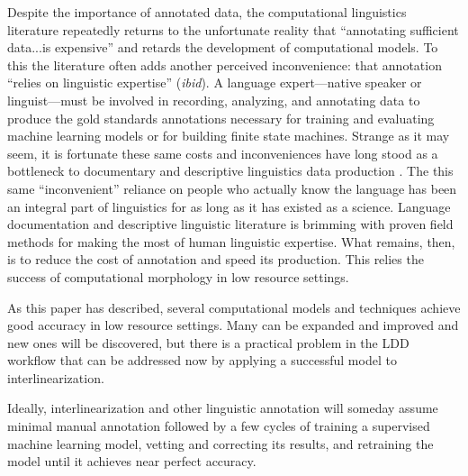 \documentclass[12pt]{article}
\begin{document}
Despite the importance of annotated data, the computational linguistics literature repeatedly returns to the unfortunate reality that ``annotating sufficient data...is expensive'' \cite[page 1954]{cotterell_cross-lingual_2017} and retards the development of computational models. To this the literature often adds another perceived inconvenience: that annotation ``relies on linguistic expertise'' (\textit{ibid}). A language expert—native speaker or linguist—must be involved in recording, analyzing, and annotating data to produce the gold standards annotations necessary for training and evaluating machine learning models or for building finite state machines. Strange as it may seem, it is fortunate these same costs and inconveniences have long stood as a bottleneck to documentary and descriptive linguistics data production \cite{bird_documentary_2015,bettinson_developing_2017,holton_developing_2017}. The this same ``inconvenient'' reliance on people who actually know the language has been an integral part of linguistics for as long as it has existed as a science. Language documentation and descriptive linguistic literature is brimming with proven field methods for making the most of human linguistic expertise. What remains, then, is to reduce the cost of annotation and speed its production. This relies the success of computational morphology in low resource settings.

As this paper has described, several computational models and techniques achieve good accuracy in low resource settings. Many can be expanded and improved and new ones will be discovered, but there is a practical problem in the LDD workflow that can be addressed now by applying a successful model to interlinearization.

Ideally, interlinearization and other linguistic annotation will someday assume minimal manual annotation followed by a few cycles of training a supervised machine learning model, vetting and correcting its results, and retraining the model until it achieves near perfect accuracy. 

\newpage



\end{document}
